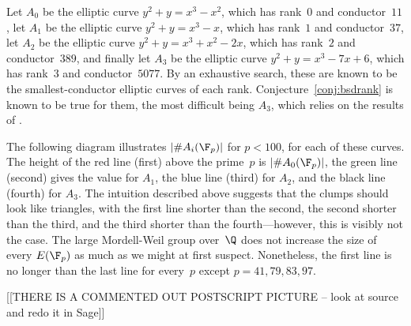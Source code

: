 \documentclass{report}
\begin{document}
\begin{example}
  Let $A_0$ be the elliptic curve $y^2 + y = x^3 - x^2 $, which has
  rank~$0$ and conductor~$11$, let $A_1$ be the elliptic curve $y^2 +
  y = x^3 - x$, which has rank~$1$ and conductor~$37$, let $A_2$ be
  the elliptic curve $y^2 + y = x^3 + x^2 - 2x$, which has rank~$2$
  and conductor~$389$, and finally let $A_3$ be the elliptic curve
  $y^2 + y = x^3 - 7x + 6$, which has rank~$3$ and conductor~$5077$.
  By an exhaustive search, these are known to be the
  smallest-conductor elliptic curves of each rank.
  Conjecture~\ref{conj:bsdrank} is known to be true for them, the most
  difficult being $A_3$, which relies on the results of
  \cite{gross-zagier}.

  The following diagram illustrates $|\#A_i(\F_p)|$ for $p<100$, for
  each of these curves.  The height of the red line (first) above the
  prime~$p$ is $|\#A_0(\F_p)|$, the green line (second) gives the
  value for $A_1$, the blue line (third) for $A_2$, and the black line
  (fourth) for $A_3$.  The intuition described above suggests that the
  clumps should look like triangles, with the first line shorter than the
  second, the second shorter than the third, and the third shorter
  than the fourth---however, this is visibly not the case.  The large
  Mordell-Weil group over~$\Q$ does not increase the size of every
  $E(\F_p)$ as much as we might at first suspect.  Nonetheless, the
  first line is no longer than the last line for every~$p$ except
  $p=41,79,83,97$.

  [[THERE IS A COMMENTED OUT POSTSCRIPT PICTURE -- look at source and
  redo it in Sage]]



\end{example}
\end{document}
